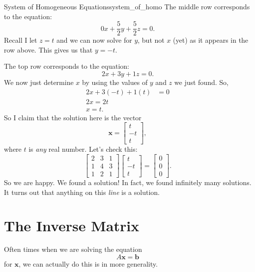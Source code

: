\begin{ex}{System of Homogeneous Equations}{system_of_homo}
        The middle row corresponds to the equation:
        \[
        0x+\frac{5}{2}y+\frac{5}{2}z=0.
        \]
        Recall I let $z=t$ and we can now solve for $y$, but not $x$ (yet) as it appears in the row above.  This gives us that $y=-t$.
        
        The top row corresponds to the equation:
        \[
        2x+3y+1z=0.
        \]
        We now just determine $x$ by using the values of $y$ and $z$ we just found. So,
        \begin{align*}
        2x+3(-t)+1(t)&=0\\
        2x=2t\\
        x=t.
        \end{align*}
        So I claim that the solution here is the vector
        \[
        \mathbf{x}=\begin{bmatrix} t \\ -t \\ t\end{bmatrix},
        \]
        where $t$ is \emph{any} real number.  Let's check this:
        \[
        \begin{bmatrix}
        2 & 3 & 1\\
        1 & 4 & 3\\
        1 & 2 & 1
        \end{bmatrix}
        \begin{bmatrix}
        t\\
        -t\\
        t
        \end{bmatrix}
        =\begin{bmatrix}
        0\\
        0\\
        0
        \end{bmatrix}.
        \]
        So we are happy.  We found a solution! In fact, we found infinitely many solutions.  It turns out that anything on this \emph{line} is a solution.
        
        \end{ex}
        

        
    \section{The Inverse Matrix}
        Often times when we are solving the equation
        \[
        A\mathbf{x}=\mathbf{b}
        \]
        for $\mathbf{x}$, we can actually do this is in more generality.
        

